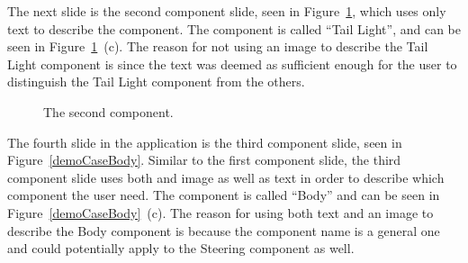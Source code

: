 The next slide is the second component slide, seen in Figure~\ref{demoCaseTailLight}, which uses only text to describe the component. The component is called ``Tail Light'', and can be seen in Figure~\ref{demoCaseTailLight}~(c). The reason for not using an image to describe the Tail Light component is since the text was deemed as sufficient enough for the user to distinguish the Tail Light component from the others.

	\begin{figure}[ht!]
		\centering
		\qquad
		\qquad
		\caption{The second component.}
		\label{demoCaseTailLight}
	\end{figure}

The fourth slide in the application is the third component slide, seen in Figure~\ref{demoCaseBody}. Similar to the first component slide, the third component slide uses both and image as well as text in order to describe which component the user need. The component is called ``Body'' and can be seen in Figure~\ref{demoCaseBody}~(c). The reason for using both text and an image to describe the Body component is because the component name is a general one and could potentially apply to the Steering component as well.

